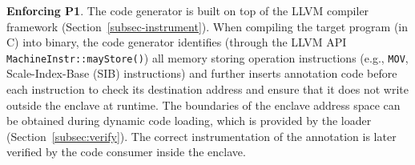 


 




\vspace{3pt}\noindent\textbf{Enforcing P1}.  The code generator is built on top of the LLVM compiler framework (Section~\ref{subsec-instrument}). When compiling the target program (in C) into binary, the code generator identifies (through the LLVM API \verb|MachineInstr::mayStore()|) all memory storing operation instructions (e.g., \texttt{MOV}, Scale-Index-Base (SIB) instructions) and further inserts annotation code before each instruction to check its destination address and ensure that it does not write outside the enclave at runtime. 
The boundaries of the enclave address space can be obtained during dynamic code loading, which is provided by the loader (Section~\ref{subsec:verify}). The correct instrumentation of the annotation is later verified by the code consumer inside the enclave. 

